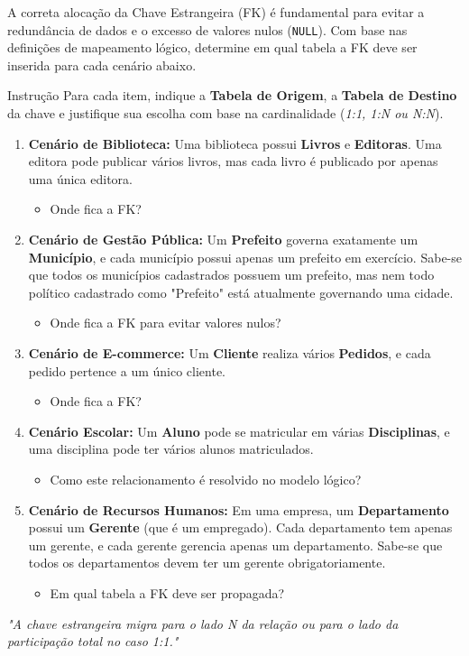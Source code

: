 \documentclass[12pt]{article}
\begin{document}
A correta alocação da Chave Estrangeira (FK) é fundamental para evitar a redundância de dados e o excesso de valores nulos (\texttt{NULL}). Com base nas definições de mapeamento lógico, determine em qual tabela a FK deve ser inserida para cada cenário abaixo.

\begin{block}{Instrução}
Para cada item, indique a \textbf{Tabela de Origem}, a \textbf{Tabela de Destino} da chave e justifique sua escolha com base na cardinalidade (\textit{1:1, 1:N ou N:N}).
\end{block}

\begin{enumerate}[label=\textbf{\arabic*.}]
    \item \textbf{Cenário de Biblioteca:} Uma biblioteca possui \textbf{Livros} e \textbf{Editoras}. Uma editora pode publicar vários livros, mas cada livro é publicado por apenas uma única editora. 
    \begin{itemize}
        \item Onde fica a FK? \hrulefill
    \end{itemize}

    \item \textbf{Cenário de Gestão Pública:} Um \textbf{Prefeito} governa exatamente um \textbf{Município}, e cada município possui apenas um prefeito em exercício. Sabe-se que todos os municípios cadastrados possuem um prefeito, mas nem todo político cadastrado como "Prefeito" está atualmente governando uma cidade.
    \begin{itemize}
        \item Onde fica a FK para evitar valores nulos? \hrulefill
    \end{itemize}

    \item \textbf{Cenário de E-commerce:} Um \textbf{Cliente} realiza vários \textbf{Pedidos}, e cada pedido pertence a um único cliente.
    \begin{itemize}
        \item Onde fica a FK? \hrulefill
    \end{itemize}

    \item \textbf{Cenário Escolar:} Um \textbf{Aluno} pode se matricular em várias \textbf{Disciplinas}, e uma disciplina pode ter vários alunos matriculados.
    \begin{itemize}
        \item Como este relacionamento é resolvido no modelo lógico? \hrulefill
    \end{itemize}

    \item \textbf{Cenário de Recursos Humanos:} Em uma empresa, um \textbf{Departamento} possui um \textbf{Gerente} (que é um empregado). Cada departamento tem apenas um gerente, e cada gerente gerencia apenas um departamento. Sabe-se que todos os departamentos devem ter um gerente obrigatoriamente.
    \begin{itemize}
        \item Em qual tabela a FK deve ser propagada? \hrulefill
    \end{itemize}
\end{enumerate}


\vfill
\begin{center}
    \textit{"A chave estrangeira migra para o lado N da relação ou para o lado da participação total no caso 1:1."}
\end{center}
\end{document}
